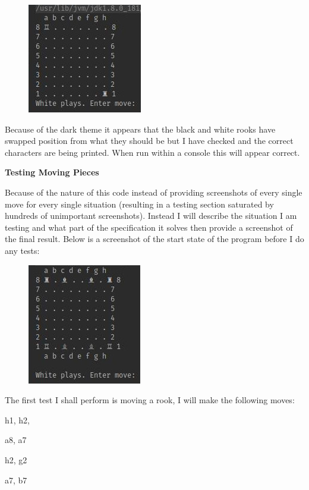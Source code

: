 \documentclass[a4paper]{article}
\begin{document}
\begin{figure}[h]
\centering
\includegraphics[scale=2.5]{screenshot1}
\end{figure}

Because of the dark theme it appears that the black and white rooks have swapped position from what they should be but I have checked and the correct characters are being printed. When run within a console this will appear correct. \newline

\noindent \textbf{Testing Moving Pieces}

Because of the nature of this code instead of providing screenshots of every single move for every single situation (resulting in a testing section saturated by hundreds of unimportant screenshots). Instead I will describe the situation I am testing and what part of the specification it solves then provide a screenshot of the final result. Below is a screenshot of the start state of the program before I do any tests:
\begin{figure}[H]
\centering
\includegraphics[scale=2.5]{startState}
\end{figure}

The first test I shall perform is moving a rook, I will make the following moves:

\noindent h1, h2,

\noindent a8, a7

\noindent h2, g2

\noindent a7, b7
\end{document}
